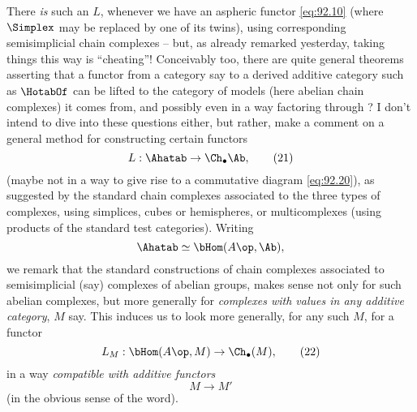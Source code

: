 There \emph{is} such an $L$, whenever we have an aspheric functor
\eqref{eq:92.10} (where $\Simplex$ may be replaced by one of its
twins), using corresponding semisimplicial chain complexes -- but, as
already remarked yesterday, taking things this way is ``cheating''!
Conceivably too, there are quite general theorems asserting that a
functor from a category \Ahat{} say to a derived additive category
such as $\HotabOf$ can be lifted to the category of models (here
abelian chain complexes) it comes from, and possibly even in a way
factoring through \Ahatab? I don't intend to dive into these questions
either, but rather, make a comment on a general method for
constructing certain functors
\begin{equation}
  \label{eq:92.21}
  L:\Ahatab\to\Ch_\bullet\Ab,\tag{21}
\end{equation}
(maybe not in a way to give rise to a commutative diagram
\eqref{eq:92.20}), as suggested by the standard chain complexes
associated to the three types of complexes, using simplices, cubes or
hemispheres, or multicomplexes (using products of the standard test
categories). Writing
\[\Ahatab\simeq \bHom(A\op,\Ab),\]
we remark that the standard constructions of chain complexes
associated to semisimplicial (say) complexes of abelian groups, makes
sense not only for such abelian complexes, but more generally for
\emph{complexes with values in \emph{any} additive category}, $M$
say. This induces us to look more generally, for any such $M$, for a
functor
\begin{equation}
  \label{eq:92.22}
  L_M:\bHom(A\op,M)\to\Ch_\bullet(M),\tag{22}
\end{equation}
in a way \emph{compatible with additive functors}
\[M\to M'\]
(in the obvious sense of the word).

